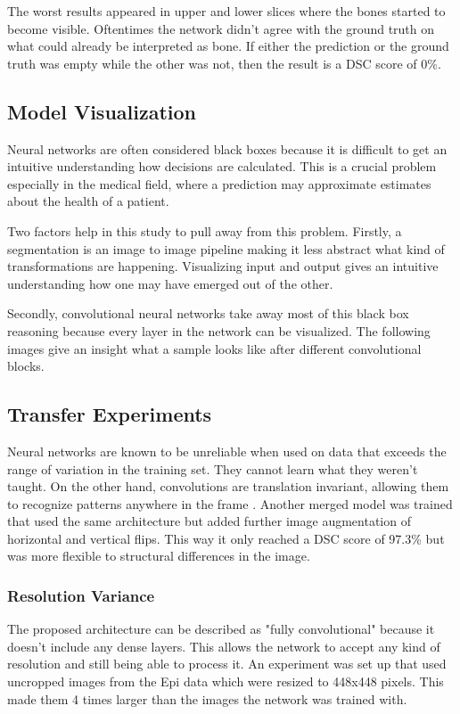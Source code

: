 The worst results appeared in upper and lower slices where the bones started to become visible. Oftentimes the network didn't agree with the ground truth on what could already be interpreted as bone. If either the prediction or the ground truth was empty while the other was not, then the result is a DSC score of 0\%.

\subsection{Model Visualization}

Neural networks are often considered black boxes because it is difficult to get an intuitive understanding how decisions are calculated. This is a crucial problem especially in the medical field, where a prediction may approximate estimates about the health of a patient.

Two factors help in this study to pull away from this problem. Firstly, a segmentation is an image to image pipeline making it less abstract what kind of transformations are happening. Visualizing input and output gives an intuitive understanding how one may have emerged out of the other.

Secondly, convolutional neural networks take away most of this black box reasoning \cite{Chollet2017} because every layer in the network can be visualized. The following images give an insight what a sample looks like after different convolutional blocks.

\subsection{Transfer Experiments}

Neural networks are known to be unreliable when used on data that exceeds the range of variation in the training set. They cannot learn what they weren't taught. On the other hand, convolutions are translation invariant, allowing them to recognize patterns anywhere in the frame \cite{Chollet2017}. Another merged model was trained that used the same architecture but added further image augmentation of horizontal and vertical flips. This way it only reached a DSC score of 97.3\% but was more flexible to structural differences in the image.

\subsubsection{Resolution Variance}

The proposed architecture can be described as "fully convolutional" because it doesn't include any dense layers. This allows the network to accept any kind of resolution and still being able to process it. An experiment was set up that used uncropped images from the Epi data which were resized to 448x448 pixels. This made them 4 times larger than the images the network was trained with.

